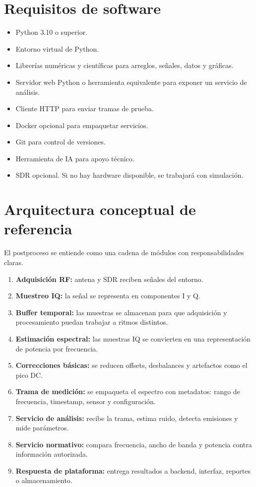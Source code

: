 \documentclass[11pt,a4paper]{article}
\begin{document}
\section*{Requisitos de software}

\begin{itemize}
  \item Python 3.10 o superior.
  \item Entorno virtual de Python.
  \item Librerías numéricas y científicas para arreglos, señales, datos y gráficas.
  \item Servidor web Python o herramienta equivalente para exponer un servicio de análisis.
  \item Cliente HTTP para enviar tramas de prueba.
  \item Docker opcional para empaquetar servicios.
  \item Git para control de versiones.
  \item Herramienta de IA para apoyo técnico.
  \item SDR opcional. Si no hay hardware disponible, se trabajará con simulación.
\end{itemize}

\section*{Arquitectura conceptual de referencia}

El postproceso se entiende como una cadena de módulos con responsabilidades claras.

\begin{enumerate}
  \item \textbf{Adquisición RF:} antena y SDR reciben señales del entorno.
  \item \textbf{Muestreo IQ:} la señal se representa en componentes I y Q.
  \item \textbf{Buffer temporal:} las muestras se almacenan para que adquisición y procesamiento puedan trabajar a ritmos distintos.
  \item \textbf{Estimación espectral:} las muestras IQ se convierten en una representación de potencia por frecuencia.
  \item \textbf{Correcciones básicas:} se reducen offsets, desbalances y artefactos como el pico DC.
  \item \textbf{Trama de medición:} se empaqueta el espectro con metadatos: rango de frecuencia, timestamp, sensor y configuración.
  \item \textbf{Servicio de análisis:} recibe la trama, estima ruido, detecta emisiones y mide parámetros.
  \item \textbf{Servicio normativo:} compara frecuencia, ancho de banda y potencia contra información autorizada.
  \item \textbf{Respuesta de plataforma:} entrega resultados a backend, interfaz, reportes o almacenamiento.
\end{enumerate}
\end{document}
